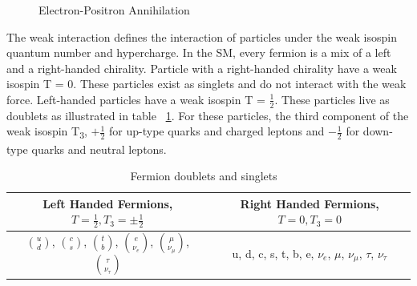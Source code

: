 \begin{figure}[h]
\begin{center}
\caption[Electron-Positron Annihilation]{Electron-Positron Annihilation}
\label{Fey:e-p}
\end{center}
\end{figure}

\indent The weak interaction defines the interaction of particles under the weak isospin quantum number and hypercharge. In the SM, every fermion is a mix of a left and a right-handed chirality. Particle with a right-handed chirality have a weak isospin T = 0. These particles exist as singlets and do not interact with the weak force. Left-handed particles have a weak isospin T =  ${\frac{1}{2}}$. These particles live as doublets as illustrated in table ~\ref{tab:chiral}. For these particles, the third component of the weak isospin T\textsubscript{3}, ${+\frac{1}{2}}$ for up-type quarks and charged leptons and ${-\frac{1}{2}}$ for down-type quarks and neutral leptons.\newline %

\begin{table}[h]
\begin{center}
\def\arraystretch{1.5}
\begin{tabular}[h]{|c|c|}
\hline
Left Handed Fermions, ${T = \frac{1}{2}, T_{3} = \pm\frac{1}{2}}$ & Right Handed Fermions, ${T = 0, T_{3} = 0}$\\
\hline\hline
${\binom{u}{d}}$, ${\binom{c}{s}}$, ${\binom{t}{b}}$, ${\binom{e}{\nu_{e}}}$, ${\binom{\mu}{\nu_{\mu}}}$, ${\binom{\tau}{\nu_{\tau}}}$ & u, d, c, s, t, b, e, ${\nu_{e}}$, ${\mu}$, ${\nu_{\mu}}$, ${\tau}$, ${\nu_{\tau}}$ \\
\hline
\end{tabular}
\caption[Fermion doublets and singlets]{Fermion doublets and singlets ~\cite{Ian:2018}}
\label{tab:chiral}
\end{center}
\end{table}


